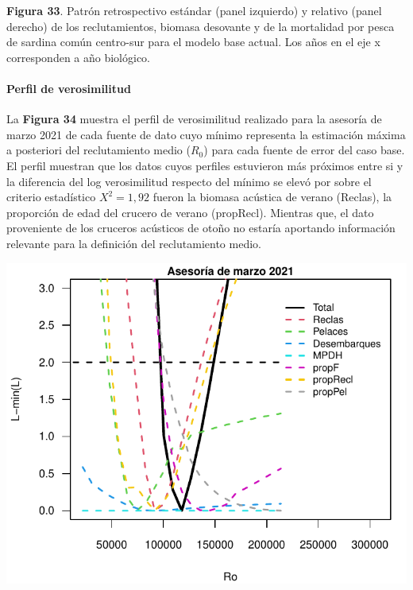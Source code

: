 \documentclass[
  spanish,
]{article}
\begin{document}
\vspace{-0.5cm}
\small

\textbf{Figura 33}. Patrón retrospectivo estándar (panel izquierdo) y
relativo (panel derecho) de los reclutamientos, biomasa desovante y de
la mortalidad por pesca de sardina común centro-sur para el modelo base
actual. Los años en el eje x corresponden a año biológico. \normalsize

\pagebreak

\hypertarget{perfil-de-verosimilitud}{%
\paragraph{Perfil de verosimilitud}\label{perfil-de-verosimilitud}}

\quad

La \textbf{Figura 34} muestra el perfil de verosimilitud realizado para
la asesoría de marzo 2021 de cada fuente de dato cuyo mínimo representa
la estimación máxima a posteriori del reclutamiento medio (\(R_0\)) para
cada fuente de error del caso base. El perfil muestran que los datos
cuyos perfiles estuvieron más próximos entre si y la diferencia del log
verosimilitud respecto del mínimo se elevó por sobre el criterio
estadístico \(X^2=1,92\) fueron la biomasa acústica de verano (Reclas),
la proporción de edad del crucero de verano (propRecl). Mientras que, el
dato proveniente de los cruceros acústicos de otoño no estaría aportando
información relevante para la definición del reclutamiento medio.

\begin{center}\includegraphics{FigurasInforme_Marzo/F34_verosimilitud_marz-1} \end{center}
\end{document}
